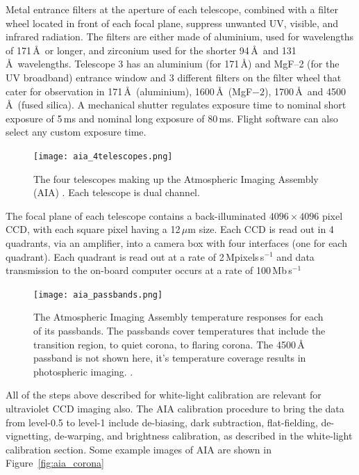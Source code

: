 Metal entrance filters at the aperture of each telescope, combined with a filter wheel located in front of each focal plane, suppress unwanted UV, visible, and infrared radiation. The filters are either made of aluminium, used for wavelengths of 171\,\AA~or longer, and zirconium used for the shorter 94\,\AA~and 131\,\AA~wavelengths. Telescope 3 has an aluminium (for 171\,\AA) and MgF--2 (for the UV broadband) entrance window and 3 different filters on the filter wheel that cater for observation in 171\,\AA~(aluminium), 1600\,\AA~(MgF$-2$), 1700\,\AA~and 4500\,\AA~(fused silica). A mechanical shutter regulates exposure time to nominal short exposure of 5\,ms and nominal long exposure of 80\,ms. Flight software can also select any custom exposure time.
\begin{figure}[!t]
\begin{center}
\texttt{[image: aia\_4telescopes.png]}
\caption[The four telescopes of AIA]{The four telescopes making up the Atmospheric Imaging Assembly (AIA) \citep{lemen2012}. Each telescope is dual channel.}
\label{fig:aia_four_tel}
\end{center}
\end{figure}
The focal plane of each telescope contains a back-illuminated $4096\times4096$ pixel CCD, with each square pixel having a 12\,$\mu$m size. Each CCD is read out in 4 quadrants, via an amplifier, into a camera box with four interfaces (one for each quadrant). Each quadrant is read out at a rate of 2\,Mpixels\,s$^{-1}$ and data transmission to the on-board computer occurs at a rate of 100\,Mb\,s$^{-1}$
\begin{figure}[!t]
\begin{center}
\texttt{[image: aia\_passbands.png]}
\caption[AIA temperature response]{The Atmospheric Imaging Assembly temperature responses for each of its passbands. The passbands cover temperatures that include the transition region, to quiet corona, to flaring corona. The 4500\,\AA~ passband is not shown here, it's temperature coverage results in photospheric imaging. \citep{lemen2012}.}
\label{fig:aia_pass}
\end{center}
\end{figure}
All of the steps above described for white-light calibration are relevant for ultraviolet CCD imaging also. The AIA calibration procedure to bring the data from level-0.5 to level-1 include de-biasing, dark subtraction, flat-fielding, de-vignetting, de-warping, and brightness calibration, as described in the white-light calibration section. Some example images of AIA are shown in Figure~\ref{fig:aia_corona}

